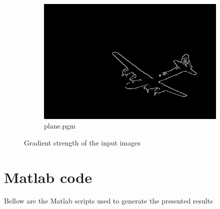 \documentclass{article}
\begin{document}
\begin{figure}[!h]
  \begin{subfigure}{0.7\textwidth}
  \centering
    \includegraphics[width=\textwidth]{planenonmax}
    \caption{plane.pgm}
    \label{fig:f2}
  \end{subfigure}
 \caption{Gradient strength of the input images}
\end{figure}



%
%



\vspace{.1pc}
\section{Matlab code}

Bellow are the Matlab scripts used to generate the presented results
\end{document}
